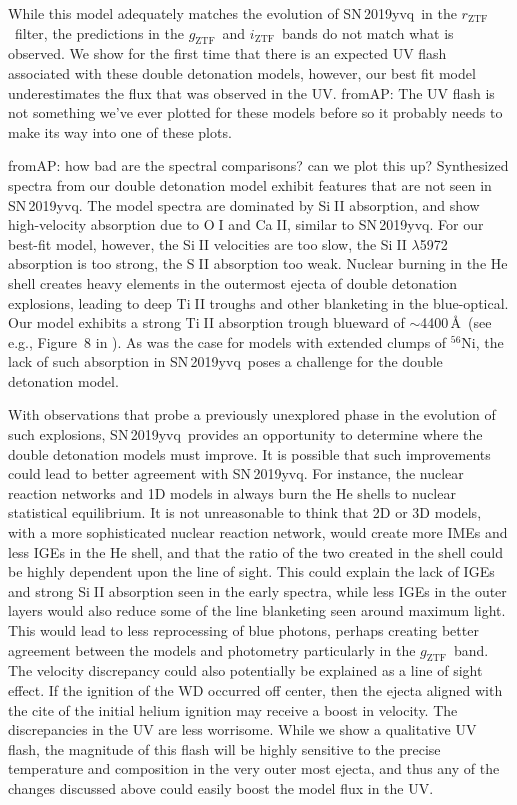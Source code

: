 \documentclass[twocolumn]{aastex63}
\def\ion#1#2{#1$\;${\footnotesize\rm{#2}}\relax}
\newcommand{\fromabi}[1]{{\color{teal} fromAP: {#1}}}
\newcommand{\rztf}{$r_\mathrm{ZTF}$}
\newcommand{\gztf}{$g_\mathrm{ZTF}$}
\newcommand{\iztf}{$i_\mathrm{ZTF}$}
\newcommand{\radni}{$^{56}$Ni}
\newcommand{\sn}{SN\,2019yvq}
\begin{document}
While this model adequately matches the evolution of \sn\ in the \rztf\
filter, the predictions in the \gztf\ and \iztf\ bands do not match what is
observed. We show for the first time that there is an expected UV flash
associated with these double detonation models, however, our best fit model
underestimates the flux that was observed in the UV. \fromabi{The UV flash is
not something we've ever plotted for these models before so it probably needs
to make its way into one of these plots.}

\fromabi{how bad are the spectral comparisons? can we plot this up?}
Synthesized spectra from our double detonation model exhibit features that are
not seen in \sn. The model spectra are dominated by \ion{Si}{II} absorption,
and show high-velocity absorption due to \ion{O}{I} and \ion{Ca}{II}, similar
to \sn. For our best-fit model, however, the \ion{Si}{II} velocities are too
slow, the \ion{Si}{II} $\lambda$5972 absorption is too strong, the \ion{S}{II}
absorption too weak. Nuclear burning in the He shell creates heavy elements in
the outermost ejecta of double detonation explosions, leading to deep
\ion{Ti}{II} troughs and other blanketing in the blue-optical. Our model
exhibits a strong \ion{Ti}{II} absorption trough blueward of $\sim$4400\,\AA\
(see e.g., Figure~8 in \citealt{Polin19}). As was the case for models with
extended clumps of \radni, the lack of such absorption in \sn\ poses a
challenge for the double detonation model.

With observations that probe a previously unexplored phase in the evolution of
such explosions, \sn\ provides an opportunity to determine where the double
detonation models must improve. It is possible that such improvements could
lead to better agreement with \sn. For instance, the nuclear reaction networks
and 1D models in \citet{Polin19} always burn the He shells to nuclear
statistical equilibrium. It is not unreasonable to think that 2D or 3D models,
with a more sophisticated nuclear reaction network, would create more IMEs and
less IGEs in the He shell, and that the ratio of the two created in the shell
could be highly dependent upon the line of sight. This could explain the lack
of IGEs and strong \ion{Si}{II} absorption seen in the early spectra, while
less IGEs in the outer layers would also reduce some of the line blanketing
seen around maximum light. This would lead to less reprocessing of blue
photons, perhaps creating better agreement between the models and photometry
particularly in the \gztf\ band. The velocity discrepancy could also
potentially be explained as a line of sight effect. If the ignition of the WD
occurred off center, then the ejecta aligned with the cite of the initial
helium ignition may receive a boost in velocity. The discrepancies in the UV
are less worrisome. While we show a qualitative UV flash, the magnitude of
this flash will be highly sensitive to the precise temperature and composition
in the very outer most ejecta, and thus any of the changes discussed above
could easily boost the model flux in the UV.
\end{document}
